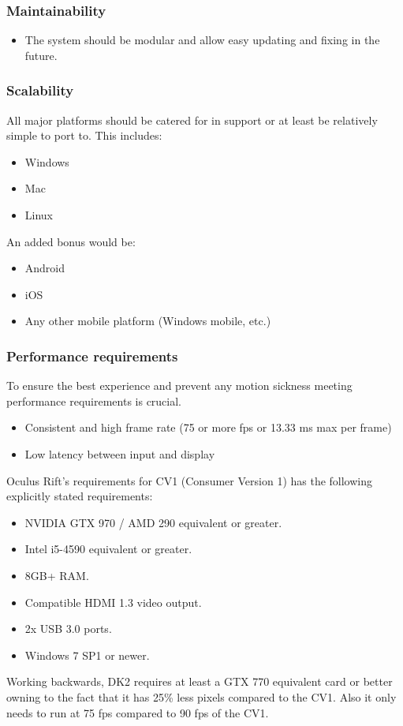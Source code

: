\documentclass[a4paper,12pt]{report}
\begin{document}
\subsubsection{Maintainability}
	\begin{itemize}
		\item The system should be modular and allow easy updating and fixing in the future.
	\end{itemize}

\subsubsection{Scalability}
All major platforms should be catered for in support or at least be relatively simple to port to. This includes:
	\begin{itemize}
		\item Windows
		\item Mac
		\item Linux		
	\end{itemize}
An added bonus would be:
	\begin{itemize}
		\item Android
		\item iOS
		\item Any other mobile platform (Windows mobile, etc.)
	\end{itemize}
	
\subsubsection{Performance requirements}
To ensure the best experience and prevent any motion sickness meeting performance requirements is crucial.
	\begin{itemize}
		\item Consistent and high frame rate (75 or more fps or 13.33 ms max per frame)
		\item Low latency between input and display
	\end{itemize}
Oculus Rift's requirements for CV1 (Consumer Version 1) has the following explicitly stated requirements:
\begin{itemize}
	\item NVIDIA GTX 970 / AMD 290 equivalent or greater.
	\item Intel i5-4590 equivalent or greater.
	\item 8GB+ RAM.
	\item Compatible HDMI 1.3 video output.
	\item 2x USB 3.0 ports.
	\item Windows 7 SP1 or newer.
\end{itemize}
Working backwards, DK2 requires at least a GTX 770 equivalent card or better owning to the fact that it has 25\% less pixels compared to the CV1. Also it only needs to run at 75 fps compared to 90 fps of the CV1.
\end{document}
